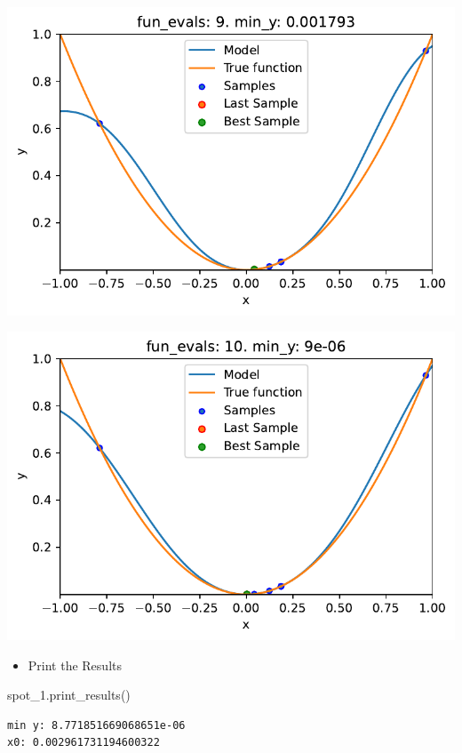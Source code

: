 \documentclass[
  letterpaper,
  DIV=11,
  numbers=noendperiod]{scrreprt}
\newenvironment{Shaded}{\begin{snugshade}}{\end{snugshade}}
\newcommand{\NormalTok}[1]{\textcolor[rgb]{0.00,0.23,0.31}{#1}}
\providecommand{\tightlist}{%
  \setlength{\itemsep}{0pt}\setlength{\parskip}{0pt}}\usepackage{longtable,booktabs,array}
\begin{document}
\includegraphics{010_num_spot_sklearn_surrogate_files/figure-pdf/cell-39-output-8.pdf}

\includegraphics{010_num_spot_sklearn_surrogate_files/figure-pdf/cell-39-output-9.pdf}

\begin{itemize}
\tightlist
\item
  Print the Results
\end{itemize}

\begin{Shaded}
\begin{Highlighting}[]
\NormalTok{spot\_1.print\_results()}
\end{Highlighting}
\end{Shaded}

\begin{verbatim}
min y: 8.771851669068651e-06
x0: 0.002961731194600322
\end{verbatim}
\end{document}
